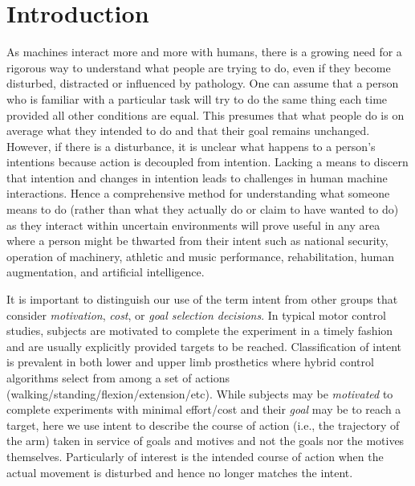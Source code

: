 \documentclass[10pt]{article}
\begin{document}
\section*{Introduction}
As machines interact more and more with humans, there is a growing need for a rigorous way to understand what people are trying to do, even if they become disturbed, distracted or influenced by pathology. One can assume that a person who is familiar with a particular task will try to do the same thing each time provided all other conditions are equal. This presumes that what people do is on average what they intended to do and that their goal remains unchanged. However, if there is a disturbance, it is unclear what happens to a person’s intentions because action is decoupled from intention. Lacking a means to discern that intention and changes in intention leads to challenges in human machine interactions. Hence a comprehensive method for understanding what someone means to do (rather than what they actually do or claim to have wanted to do) as they interact within uncertain environments will prove useful in any area where a person might be thwarted from their intent such as national security, operation of machinery, athletic and music performance, rehabilitation, human augmentation, and artificial intelligence.

It is important to distinguish our use of the term intent from other groups that consider \textit{motivation}\cite{mcclelland1985motives, rawolle2013relationships}, \textit{cost}\cite{todorov2002optimal, flash1985coordination}, or \textit{goal selection decisions}\cite{ziebart2010modeling}. In typical motor control studies, subjects are motivated to complete the experiment in a timely fashion and are usually explicitly provided targets to be reached. Classification of intent is prevalent in both lower \cite{strausser2011development, hargrove2013robotic} and upper limb\cite{englehart2003robust, young2012improving} prosthetics where hybrid control algorithms select from among a set of actions (walking/standing/flexion/extension/etc). While subjects may be \textit{motivated} to complete experiments with minimal effort/cost and their \textit{goal} may be to reach a target, here we use intent to describe the course of action (i.e., the trajectory of the arm) taken in service of goals and motives and not the goals nor the motives themselves. Particularly of interest is the intended course of action when the actual movement is disturbed and hence no longer matches the intent.
\end{document}
